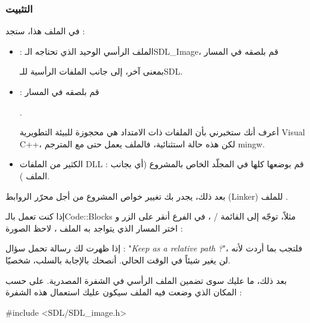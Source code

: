 \subsubsection{التثبيت}

في الملف
هذا، ستجد :

\begin{itemize}
	\item {} :
	 الملف الرأسي الوحيد الذي تحتاجه الـ\textenglish{SDL\_Image}،
	 قم بلصقه في المسار
	 
	 
	 بمعنى آخر، إلى جانب الملفات الرأسية للـ\textenglish{SDL}.
	\item {} :
	قم بلصقه في المسار
	
	.
	
	أعرف أنك ستخبرني بأن الملفات ذات الامتداد
	هي محجوزة للبيئة التطويرية
	\textenglish{Visual C++}،
	لكن هذه حالة استثنائية، فالملف 
	يعمل حتى مع المترجم 
	\textenglish{mingw}.
	\item الكثير من الملفات
	\textenglish{DLL} : 
	قم بوضعها كلها في المجلّد الخاص بالمشروع (أي بجانب الملف 
	).
\end{itemize}

بعد ذلك، يجدر بك تغيير خواص المشروع من أجل محرّر الروابط
(\textenglish{Linker})
للملف
.

إذا كنت تعمل بالـ\textenglish{Code::Blocks}
مثلاً، توجّه إلى القائمة
 / ،
في الفرع
أنقر على الزر 
و اختر المسار الذي يتواجد به الملف
،
لاحظ الصورة :


إذا ظهرت لك رسالة تحمل سؤال : 
"\textit{\textenglish{Keep as a relative path ?}}"،
فلتجب بما أردت لأنه لن يغير شيئاً في الوقت الحالي. أنصحك بالإجابة بالسلب، شخصيّا.

بعد ذلك، ما عليك سوى تضمين الملف الرأسي
في الشفرة المصدرية. على حسب المكان الذي وضعت فيه الملف
سيكون عليك استعمال هذه الشفرة :

\begin{Csource}
#include <SDL/SDL_image.h>
\end{Csource}

